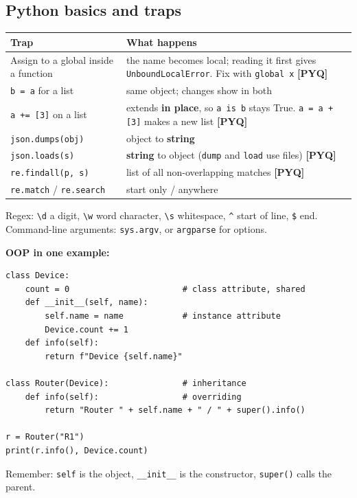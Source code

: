 \documentclass[11pt,a4paper]{article}
\newcommand{\pyq}{\textcolor{ember}{\scriptsize\textbf{[PYQ]}}}
\begin{document}
\subsection{Python basics and traps}
\begin{center}\small\renewcommand{\arraystretch}{1.18}\setlength{\tabcolsep}{9pt}
\begin{tabularx}{\linewidth}{@{}>{\raggedright\arraybackslash}X>{\raggedright\arraybackslash}X@{}}
\toprule
\textbf{\color{slate}Trap} & \textbf{\color{slate}What happens} \\ \midrule
Assign to a global inside a function & the name becomes local; reading it first gives \texttt{UnboundLocalError}. Fix with \texttt{global x} \pyq{} \\
\texttt{b = a} for a list & same object; changes show in both \\
\texttt{a += [3]} on a list & extends \textbf{in place}, so \texttt{a is b} stays True. \texttt{a = a + [3]} makes a new list \pyq{} \\
\texttt{json.dumps(obj)} & object to \textbf{string} \\
\texttt{json.loads(s)} & \textbf{string} to object (\texttt{dump} and \texttt{load} use files) \pyq{} \\
\texttt{re.findall(p, s)} & list of all non-overlapping matches \pyq{} \\
\texttt{re.match} / \texttt{re.search} & start only / anywhere \\
\bottomrule
\end{tabularx}\end{center}
Regex: \texttt{\textbackslash{}d} a digit, \texttt{\textbackslash{}w} word character, \texttt{\textbackslash{}s} whitespace, \texttt{\textasciicircum{}} start of line, \texttt{\$} end. Command-line arguments: \texttt{sys.argv}, or \texttt{argparse} for options.

\textbf{OOP in one example:}

\begin{lstlisting}
class Device:
    count = 0                       # class attribute, shared
    def __init__(self, name):
        self.name = name            # instance attribute
        Device.count += 1
    def info(self):
        return f"Device {self.name}"

class Router(Device):               # inheritance
    def info(self):                 # overriding
        return "Router " + self.name + " / " + super().info()

r = Router("R1")
print(r.info(), Device.count)
\end{lstlisting}
Remember: \texttt{self} is the object, \texttt{\_\_init\_\_} is the constructor, \texttt{super()} calls the parent.
\end{document}
